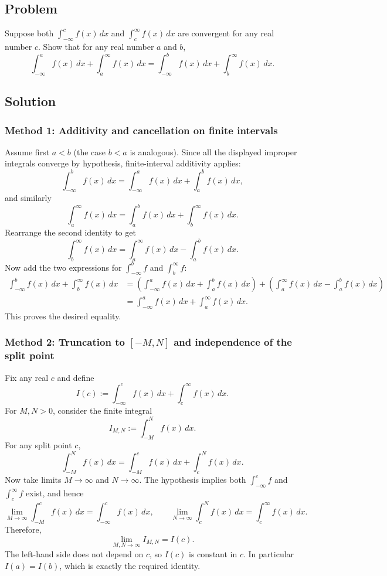 \documentclass[12pt]{article}
\begin{document}
\subsection*{Problem}
Suppose both \(\displaystyle \int_{-\infty}^{c} f(x)\,dx\) and \(\displaystyle \int_{c}^{\infty} f(x)\,dx\) are convergent for any real number \(c\). Show that for any real number \(a\) and \(b\),
\[
\int_{-\infty}^{a} f(x)\,dx + \int_{a}^{\infty} f(x)\,dx
=
\int_{-\infty}^{b} f(x)\,dx + \int_{b}^{\infty} f(x)\,dx.
\]

\subsection*{Solution}

\subsubsection*{Method 1: Additivity and cancellation on finite intervals}

Assume first \(a<b\) (the case \(b<a\) is analogous). Since all the displayed improper integrals converge by hypothesis, finite-interval additivity applies:
\[
\int_{-\infty}^{b} f(x)\,dx
=
\int_{-\infty}^{a} f(x)\,dx + \int_{a}^{b} f(x)\,dx,
\]
and similarly
\[
\int_{a}^{\infty} f(x)\,dx
=
\int_{a}^{b} f(x)\,dx + \int_{b}^{\infty} f(x)\,dx.
\]
Rearrange the second identity to get
\[
\int_{b}^{\infty} f(x)\,dx
=
\int_{a}^{\infty} f(x)\,dx - \int_{a}^{b} f(x)\,dx.
\]
Now add the two expressions for \(\int_{-\infty}^{b} f\) and \(\int_{b}^{\infty} f\):
\begin{align*}
\int_{-\infty}^{b} f(x)\,dx + \int_{b}^{\infty} f(x)\,dx
&=
\left(\int_{-\infty}^{a} f(x)\,dx + \int_{a}^{b} f(x)\,dx\right)
+
\left(\int_{a}^{\infty} f(x)\,dx - \int_{a}^{b} f(x)\,dx\right)\\
&=
\int_{-\infty}^{a} f(x)\,dx + \int_{a}^{\infty} f(x)\,dx.
\end{align*}
This proves the desired equality.

\subsubsection*{Method 2: Truncation to \([-M,N]\) and independence of the split point}

Fix any real \(c\) and define
\[
I(c) := \int_{-\infty}^{c} f(x)\,dx + \int_{c}^{\infty} f(x)\,dx.
\]
For \(M,N>0\), consider the finite integral
\[
I_{M,N} := \int_{-M}^{N} f(x)\,dx.
\]
For any split point \(c\),
\[
\int_{-M}^{N} f(x)\,dx
=
\int_{-M}^{c} f(x)\,dx + \int_{c}^{N} f(x)\,dx.
\]
Now take limits \(M\to\infty\) and \(N\to\infty\). The hypothesis implies both \(\int_{-\infty}^{c} f\) and \(\int_{c}^{\infty} f\) exist, and hence
\[
\lim_{M\to\infty}\int_{-M}^{c} f(x)\,dx = \int_{-\infty}^{c} f(x)\,dx,\qquad
\lim_{N\to\infty}\int_{c}^{N} f(x)\,dx = \int_{c}^{\infty} f(x)\,dx.
\]
Therefore,
\[
\lim_{M,N\to\infty} I_{M,N}
=
I(c).
\]
The left-hand side does not depend on \(c\), so \(I(c)\) is constant in \(c\). In particular \(I(a)=I(b)\), which is exactly the required identity.
\end{document}
